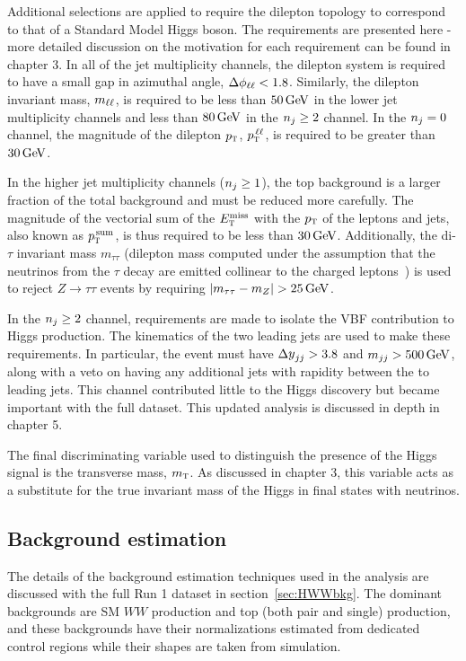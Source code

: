 Additional selections are applied to require the dilepton topology to correspond to that of a Standard Model Higgs boson. The requirements are presented here - more detailed discussion on the motivation for each requirement can be found in chapter 3. In all of the jet multiplicity channels, the dilepton system is required to have a small gap in azimuthal angle, $\Delta\phi_{\ell\ell} < 1.8$. Similarly, the dilepton invariant mass, $m_{\ell\ell}$, is required to be less than $50 \GeV$ in the lower jet multiplicity channels and less than $80 \GeV$ in the $n_j \geq 2$ channel.  In the $n_j = 0$ channel, the magnitude of the dilepton $p_{\textrm{\footnotesize\sc t}}$, $p_{\textrm{\footnotesize\sc t}}^{\,\ell\ell}$, is required to be greater than $30 \GeV$. 

In the higher jet multiplicity channels ($n_j \geq 1$), the top background is a larger fraction of the total background and must be reduced more carefully. The magnitude of the vectorial sum of the $E_{\textrm{\footnotesize\sc t}}^{\rm miss}$ with the $p_{\textrm{\footnotesize\sc t}}$ of the leptons and jets, also known as $p_{\textrm{\footnotesize\sc t}}^{\,\rm sum}$, is thus required to be less than $30 \GeV$. Additionally, the di-$\tau$ invariant mass $m_{\tau\tau}$ (dilepton mass computed under the assumption that the neutrinos from the $\tau$ decay are emitted collinear to the charged leptons~\cite{collinear}) is used to reject $Z\to\tau\tau$ events by requiring $|m_{\tau\tau} - m_{Z}| > 25 \GeV$.  

In the $n_j \geq 2$ channel, requirements are made to isolate the VBF contribution to Higgs production. The kinematics of the two leading jets are used to make these requirements. In particular, the event must have $\dyjj > 3.8$ and $\mjj > 500 \GeV$, along with a veto on having any additional jets with rapidity between the to leading jets. This channel contributed little to the Higgs discovery but became important with the full dataset. This updated analysis is discussed in depth in chapter 5. 

The final discriminating variable used to distinguish the presence of the Higgs signal is the transverse mass, $m_{\textrm{\footnotesize\sc t}}$. As discussed in chapter 3, this variable acts as a substitute for the true invariant mass of the Higgs in final states with neutrinos. 

\subsection{Background estimation}

The details of the background estimation techniques used in the \HWWfull analysis are discussed with the full Run 1 dataset in section~\ref{sec:HWWbkg}. The dominant backgrounds are SM $WW$ production and top (both pair and single) production, and these backgrounds have their normalizations estimated from dedicated control regions while their shapes are taken from simulation. 

